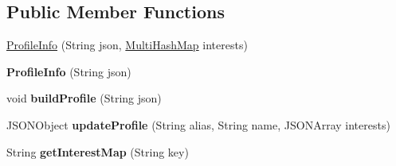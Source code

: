 \subsection*{Public Member Functions}
\begin{DoxyCompactItemize}
\item 
\hyperlink{classcom_1_1example_1_1sebastian_1_1tindertp_1_1commonTools_1_1ProfileInfo_a5e82e8fa6e169043cd953ac505fd50d5}{Profile\+Info} (String json, \hyperlink{classcom_1_1example_1_1sebastian_1_1tindertp_1_1commonTools_1_1MultiHashMap}{Multi\+Hash\+Map} interests)
\item 
{\bfseries Profile\+Info} (String json)\hypertarget{classcom_1_1example_1_1sebastian_1_1tindertp_1_1commonTools_1_1ProfileInfo_a7e33523704424032f7dd732ad27cf7f1}{}\label{classcom_1_1example_1_1sebastian_1_1tindertp_1_1commonTools_1_1ProfileInfo_a7e33523704424032f7dd732ad27cf7f1}

\item 
void {\bfseries build\+Profile} (String json)\hypertarget{classcom_1_1example_1_1sebastian_1_1tindertp_1_1commonTools_1_1ProfileInfo_a049e7a912a5a219607583acfed164859}{}\label{classcom_1_1example_1_1sebastian_1_1tindertp_1_1commonTools_1_1ProfileInfo_a049e7a912a5a219607583acfed164859}

\item 
J\+S\+O\+N\+Object {\bfseries update\+Profile} (String alias, String name, J\+S\+O\+N\+Array interests)\hypertarget{classcom_1_1example_1_1sebastian_1_1tindertp_1_1commonTools_1_1ProfileInfo_acb59ff93dd32633f238a719efe2d1cbd}{}\label{classcom_1_1example_1_1sebastian_1_1tindertp_1_1commonTools_1_1ProfileInfo_acb59ff93dd32633f238a719efe2d1cbd}

\item 
String {\bfseries get\+Interest\+Map} (String key)\hypertarget{classcom_1_1example_1_1sebastian_1_1tindertp_1_1commonTools_1_1ProfileInfo_a4746db27540af4edb7c95f9f51e0586c}{}\label{classcom_1_1example_1_1sebastian_1_1tindertp_1_1commonTools_1_1ProfileInfo_a4746db27540af4edb7c95f9f51e0586c}

\end{DoxyCompactItemize}
